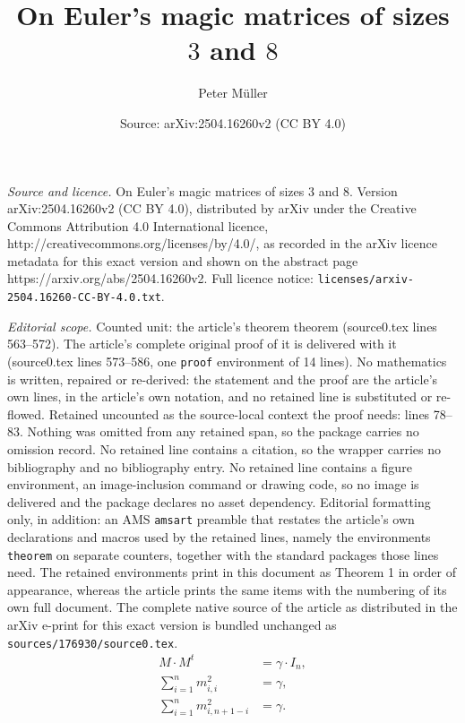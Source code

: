 \documentclass[10pt,a4paper]{amsart}
\title{On Euler's magic matrices of sizes $3$ and $8$}
\author{Peter M\"uller}
\date{Source: arXiv:2504.16260v2 (CC BY 4.0)}
\begin{document}
\maketitle

\noindent\emph{Source and licence.} On Euler's magic matrices of sizes $3$ and $8$. Version arXiv:2504.16260v2 (CC BY 4.0), distributed by arXiv under the Creative Commons Attribution 4.0 International licence, http://creativecommons.org/licenses/by/4.0/, as recorded in the arXiv licence metadata for this exact version and shown on the abstract page https://arxiv.org/abs/2504.16260v2. Full licence notice: \texttt{licenses/arxiv-2504.16260-CC-BY-4.0.txt}.\par\smallskip

\noindent\textit{Editorial scope.} Counted unit: the article's theorem theorem (source0.tex lines 563--572). The article's complete original proof of it is delivered with it (source0.tex lines 573--586, one \texttt{proof} environment of 14 lines). No mathematics is written, repaired or re-derived: the statement and the proof are the article's own lines, in the article's own notation, and no retained line is substituted or re-flowed.  Retained uncounted as the source-local context the proof needs: lines 78--83.  Nothing was omitted from any retained span, so the package carries no omission record.  No retained line contains a citation, so the wrapper carries no bibliography and no bibliography entry.  No retained line contains a figure environment, an image-inclusion command or drawing code, so no image is delivered and the package declares no asset dependency.  Editorial formatting only, in addition: an AMS \texttt{amsart} preamble that restates the article's own declarations and macros used by the retained lines, namely the environments \texttt{theorem} on separate counters, together with the standard packages those lines need.  The retained environments print in this document as Theorem 1 in order of appearance, whereas the article prints the same items with the numbering of its own full document.  The complete native source of the article as distributed in the arXiv e-print for this exact version is bundled unchanged as \texttt{sources/176930/source0.tex}.
  \begin{align}
    \label{eq:1}
    M\cdot M^t &= \gamma\cdot I_n,\\
    \sum_{i=1}^nm_{i,i}^2 &= \gamma,\label{eq:2}\\
    \sum_{i=1}^nm_{i,n+1-i}^2 &= \gamma.\label{eq:3}
  \end{align}
\end{document}
